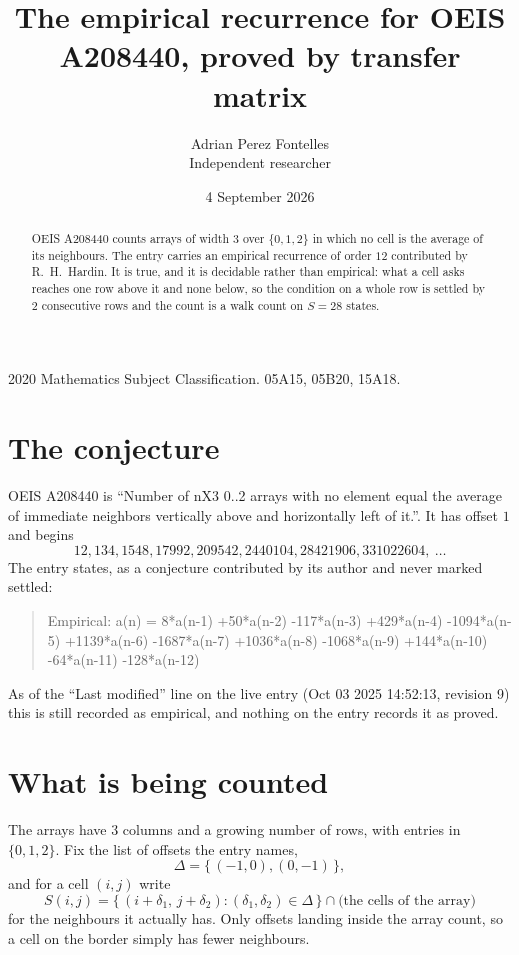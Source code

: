 \documentclass[11pt,a4paper]{article}
\title{The empirical recurrence for OEIS A208440, proved by transfer matrix}
\author{Adrian Perez Fontelles\\ \small Independent researcher}
\date{4 September 2026}
\theoremstyle{plain}
\theoremstyle{definition}
\begin{document}
\maketitle

\begin{abstract}
OEIS A208440 counts arrays of width $3$ over $\{0,1,2\}$ in which no cell is the average of its neighbours. The entry carries an
empirical recurrence of order $12$ contributed by R.~H.~Hardin. It is true, and it is
decidable rather than empirical: what a cell asks reaches one row above
it and none below, so the condition on a whole row is settled by
$2$ consecutive rows and the count is a walk count on $S=28$ states.
\end{abstract}

\noindent\small 2020 Mathematics Subject Classification. 05A15, 05B20, 15A18.\normalsize

\section{The conjecture}

OEIS A208440 is ``Number of nX3 0..2 arrays with no element equal the average of immediate neighbors vertically above and horizontally left of it.''. It has offset $1$ and begins
\[
12, 134, 1548, 17992, 209542, 2440104, 28421906, 331022604,\ \dots
\]
The entry states, as a conjecture contributed by its author and never marked settled:
\begin{quote}
Empirical: a(n) = 8*a(n-1) +50*a(n-2) -117*a(n-3) +429*a(n-4) -1094*a(n-5) +1139*a(n-6) -1687*a(n-7) +1036*a(n-8) -1068*a(n-9) +144*a(n-10) -64*a(n-11) -128*a(n-12)
\end{quote}
As of the ``Last modified'' line on the live entry (Oct 03 2025 14:52:13, revision 9) this is still
recorded as empirical, and nothing on the entry records it as proved.

\section{What is being counted}

The arrays have $3$ columns and a growing number of rows, with entries in $\{0,1,2\}$. Fix the
list of offsets the entry names,
\[
\Delta=\{\,(-1,0), (0,-1)\,\},
\]
and for a cell $(i,j)$ write
\[
S(i,j)=\{\,(i+\delta_1,\,j+\delta_2) : (\delta_1,\delta_2)\in\Delta\,\}\cap
\text{(the cells of the array)}
\]
for the neighbours it actually has. Only offsets landing inside the array count, so a cell on
the border simply has fewer neighbours.
\end{document}
